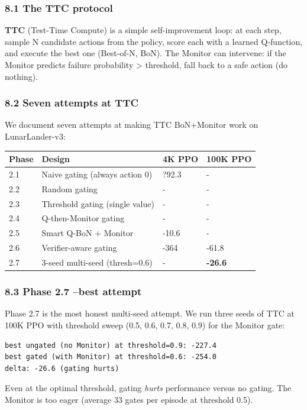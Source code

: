 \documentclass[11pt]{article}
\begin{document}
\subsubsection{8.1 The TTC protocol}

\textbf{TTC} (Test-Time Compute) is a simple self-improvement loop: at each step, sample
N candidate actions from the policy, score each with a learned Q-function, and
execute the best one (Best-of-N, BoN). The Monitor can intervene: if the Monitor
predicts failure probability > threshold, fall back to a safe action (do nothing).

\subsubsection{8.2 Seven attempts at TTC}

We document seven attempts at making TTC BoN+Monitor work on LunarLander-v3:

\begin{tabular}{llll}
Phase & Design & 4K PPO & 100K PPO \\
\hline
2.1 & Naive gating (always action 0) & ?92.3 & - \\
2.2 & Random gating & - & - \\
2.3 & Threshold gating (single value) & - & - \\
2.4 & Q-then-Monitor gating & - & - \\
2.5 & Smart Q-BoN + Monitor & -10.6 & - \\
2.6 & Verifier-aware gating & -364 & -61.8 \\
2.7 & 3-seed multi-seed (thresh=0.6) & - & \textbf{-26.6} \\
\end{tabular}


\subsubsection{8.3 Phase 2.7 --best attempt}

Phase 2.7 is the most honest multi-seed attempt. We run three seeds of TTC at 100K
PPO with threshold sweep (0.5, 0.6, 0.7, 0.8, 0.9) for the Monitor gate:

\begin{verbatim}
best ungated (no Monitor) at threshold=0.9: -227.4
best gated (with Monitor) at threshold=0.6: -254.0
delta: -26.6 (gating hurts)
\end{verbatim}

Even at the optimal threshold, gating \textit{hurts} performance versus no gating. The
Monitor is too eager (average 33 gates per episode at threshold 0.5).
\end{document}
